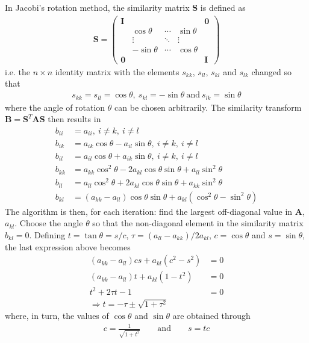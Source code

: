 \documentclass[11pt, a4paper]{article}
\newcommand{\A}{\mathbf{A}}
\renewcommand{\S}{\mathbf{S}}
\newcommand{\B}{\mathbf{B}}
\begin{document}
			In Jacobi's rotation method, the similarity matrix $\S$ is defined as
			\begin{align*}
				\S = \begin{pmatrix} \mathbf{ I } &  &  &  & \mathbf{ 0 } \\  & \cos  \theta  & \cdots  & \sin  \theta  &  \\  & \vdots & \ddots  & \vdots  &  \\  & -\sin  \theta  & \cdots  & \cos  \theta  &  \\ \mathbf{ 0 } &  &  &  & \mathbf{ I } \end{pmatrix}
			\end{align*}
			i.e.  the $n\times n$ identity matrix with the elements $s_{kk}$, $s_{ll}$, $s_{kl}$ and $s_{lk}$ changed so that
			\begin{align*}
				s_{kk} = s_{ll} = \cos\theta, \ s_{kl} = -\sin\theta \ \mathrm{and} \ s_{lk} = \sin\theta
			\end{align*}
			where the angle of rotation $\theta$ can be chosen arbitrarily.
			The similarity transform $\B=\S^T\A\S$ then results in 
			\begin{align*}
				b_{ii} 	&= a_{ii}, \ i \neq k, \ i \neq l \\
				b_{ik} 	&= a_{ik}\cos \theta - a_{il}\sin\theta,\ i \neq k, \ i \neq l \\
				b_{il} 	&= a_{il} \cos\theta + a_{ik}\sin\theta, \ i \neq k, \ i \neq l \\
				b_{kk} 	&= a_{kk}\cos^2\theta - 2a_{kl}\cos\theta \sin\theta + a_{ll}\sin^2\theta \\
				b_{ll} 	&= a_{ll}\cos^2\theta +2a_{kl}\cos\theta\sin\theta + a_{kk}\sin^2\theta \\
				b_{kl} 	&= (a_{kk} - a_{ll})\cos\theta \sin\theta +a_{kl}(\cos^2\theta - \sin^2\theta)
			\end{align*}
			The algorithm is then, for each iteration: find the largest off-diagonal value in $\A$, $a_{kl}$. Choose the angle $\theta$ so that the non-diagonal element in the similarity matrix $b_{kl}=0$. Defining $t=\tan\theta = s/c$, $\tau=(a_{ll}-a_{kk})/2a_{kl}$, $c=\cos \theta$ and $s=\sin \theta$, the last expression above becomes 
			\begin{align*}
				(a_{kk} - a_{ll})c s +a_{kl}(c^2 - s^2) 	&= 0 \\
				 (a_{kk} - a_{ll})t + a_{kl}(1-t^2)				&= 0 \\
				 t^2 + 2\tau t - 1 &= 0 \\
				 \Rightarrow t = -\tau \pm \sqrt{1+\tau^2}
			\end{align*}
			where, in turn, the values of $\cos \theta$ and $\sin \theta$ are obtained through
			\begin{align*}
				c = \frac{1}{\sqrt{1+t^2}} \qquad \mathrm{and} \qquad s = tc
			\end{align*}
			
\end{document}
